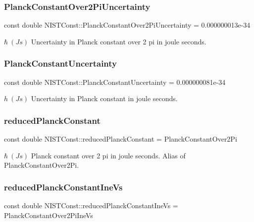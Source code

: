 \subsubsection{\texorpdfstring{Planck\+Constant\+Over2\+Pi\+Uncertainty}{PlanckConstantOver2PiUncertainty}}
{\footnotesize\ttfamily const double N\+I\+S\+T\+Const\+::\+Planck\+Constant\+Over2\+Pi\+Uncertainty = 0.\+000000013e-\/34}

$\hbar \ (J s)$ Uncertainty in Planck constant over 2 pi in joule seconds. \mbox{\label{group___planck_constant_gaf490152b8477c6ead134e42e76753f64}} 
\subsubsection{\texorpdfstring{Planck\+Constant\+Uncertainty}{PlanckConstantUncertainty}}
{\footnotesize\ttfamily const double N\+I\+S\+T\+Const\+::\+Planck\+Constant\+Uncertainty = 0.\+000000081e-\/34}

$h \ (J s)$ Uncertainty in Planck constant in joule seconds. \mbox{\label{group___planck_constant_ga91e80f15330603015f6f8f8e8f49c926}} 
\subsubsection{\texorpdfstring{reduced\+Planck\+Constant}{reducedPlanckConstant}}
{\footnotesize\ttfamily const double N\+I\+S\+T\+Const\+::reduced\+Planck\+Constant = Planck\+Constant\+Over2\+Pi}

$\hbar \ (J s)$ Planck constant over 2 pi in joule seconds. Alias of Planck\+Constant\+Over2\+Pi. \mbox{\label{group___planck_constant_gab9efdc081c1c1a03ca7a233d1589b1d8}} 
\subsubsection{\texorpdfstring{reduced\+Planck\+Constant\+Ine\+Vs}{reducedPlanckConstantIneVs}}
{\footnotesize\ttfamily const double N\+I\+S\+T\+Const\+::reduced\+Planck\+Constant\+Ine\+Vs = Planck\+Constant\+Over2\+Pi\+Ine\+Vs}

